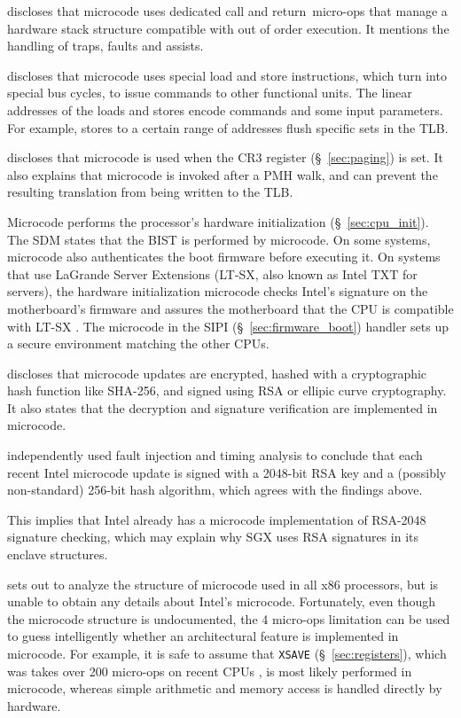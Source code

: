 \cite{intel2007microstack} discloses that microcode uses dedicated call and
return micro-ops that manage a hardware stack structure compatible with out of
order execution. It mentions the handling of traps, faults and assists.

\cite{intel1997microspace} discloses that microcode uses special load and store
instructions, which turn into special bus cycles, to issue commands to other
functional units. The linear addresses of the loads and stores encode commands
and some input parameters. For example, stores to a certain range of addresses
flush specific sets in the TLB.

\cite{intel2009pipeline} discloses that microcode is used when the CR3 register
(\S~\ref{sec:paging}) is set. It also explains that microcode is invoked after
a PMH walk, and can prevent the resulting translation from being written to the
TLB.

Microcode performs the processor's hardware initialization
(\S~\ref{sec:cpu_init}). The SDM states that the BIST is performed by
microcode. On some systems, microcode also authenticates the boot firmware
\cite{intel2012uefihypervisor} before executing it. On systems that use
LaGrande Server Extensions (LT-SX, also known as Intel TXT for servers), the
hardware initialization microcode checks Intel's signature on the motherboard's
firmware and assures the motherboard that the CPU is compatible with LT-SX
\cite{intel2012ltsx}. The microcode in the SIPI (\S~\ref{sec:firmware_boot})
handler sets up a secure environment matching the other CPUs.

\cite{intel2012patching} discloses that microcode updates are encrypted, hashed
with a cryptographic hash function like SHA-256, and signed using RSA or
ellipic curve cryptography. It also states that the decryption and signature
verification are implemented in microcode.

\cite{hawkes2012microcode} independently used fault injection and timing
analysis to conclude that each recent Intel microcode update is signed with a
2048-bit RSA key and a (possibly non-standard) 256-bit hash algorithm, which
agrees with the findings above.

This
implies that Intel already has a microcode implementation of RSA-2048 signature
checking, which may explain why SGX uses RSA signatures in its enclave
structures.

\cite{chen2014microcode} sets out to analyze the structure of microcode used in
all x86 processors, but is unable to obtain any details about Intel's
microcode. Fortunately, even though the microcode structure is undocumented,
the 4 micro-ops limitation can be used to guess intelligently whether an
architectural feature is implemented in microcode. For example, it is safe to
assume that \texttt{XSAVE} (\S~\ref{sec:registers}), which was takes over 200
micro-ops on recent CPUs \cite{fog2014microops}, is most likely performed in
microcode, whereas simple arithmetic and memory access is handled directly by
hardware.

